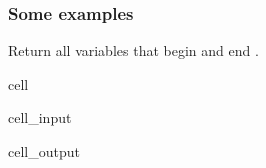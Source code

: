 \documentclass[letterpaper,10pt,english]{jupyterBook}
\begin{document}
\subsubsection{Some examples}
\label{\detokenize{content/06_WBModels/LoadingWBModel:some-examples}}
\sphinxAtStartPar
Return all variables that begin  and end .

\begin{sphinxuseclass}{cell}\begin{sphinxVerbatimInput}

\begin{sphinxuseclass}{cell_input}
\begin{sphinxVerbatim}[commandchars=\\\{\}]
\PYG{p}{[}\PYG{p}{]}
\end{sphinxVerbatim}

\end{sphinxuseclass}\end{sphinxVerbatimInput}
\begin{sphinxVerbatimOutput}

\begin{sphinxuseclass}{cell_output}
\begin{sphinxVerbatim}
\end{sphinxVerbatim}

\end{sphinxuseclass}\end{sphinxVerbatimOutput}

\end{sphinxuseclass}
\end{document}
